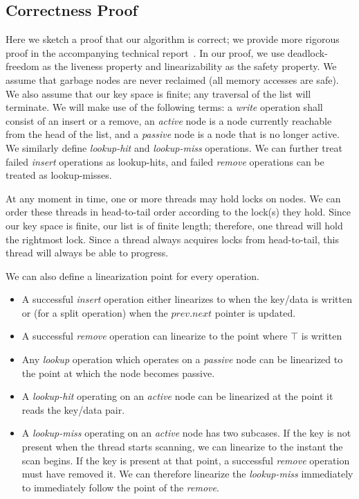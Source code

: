 \documentclass{llncs}
\begin{document}
{\subsection{Correctness Proof}
Here we sketch a proof that our algorithm is correct; we provide more rigorous proof in the accompanying technical report~\cite{Platz:Unrolled}. In our proof, we use deadlock-freedom as 
the liveness property and linearizability as the safety property.  We assume that garbage nodes are never reclaimed (all memory accesses are safe).  We also assume that our key space is finite; any traversal of the list will terminate.  We will make use of the following terms: a {\em write} operation shall consist of an insert or
a remove, an {\em active} node is a node currently reachable from the head of the list,
and a {\em passive} node is a node that is no longer active.  We similarly
define {\em lookup-hit} and {\em lookup-miss} operations.  We can further treat
failed {\em insert} operations as lookup-hits, and failed {\em remove} operations
can be treated as lookup-misses. 

At any moment in time, one or more threads may hold locks on nodes.  We can
order these threads in head-to-tail order according to the lock(s) they hold.  
Since our key space is finite, our list is of finite length; therefore,
one thread will hold the rightmost lock.  Since a thread always acquires locks from
head-to-tail, this thread will always be able to progress.

We can also define a linearization point for every operation.
\begin{itemize}
\item A successful {\em insert} operation either linearizes to when the key/data is written or
(for a split operation) when the $prev.next$ pointer is updated.
\item A successful {\em remove} operation can linearize to the point where $\top$ is written
\item Any {\em lookup} operation which operates on a {\em passive} node can be linearized to
the point at which the node becomes passive.
\item A {\em lookup-hit} operating on an {\em active} node can be linearized at the point
it reads the key/data pair.
\item A {\em lookup-miss} operating on an {\em active} node has two subcases.  If the
key is not present when the thread starts scanning, we can linearize to the instant the
scan begins.  If the key is present at that point, a successful {\em remove} operation must
have removed it.  We can therefore linearize the {\em lookup-miss} immediately to immediately follow the point of the {\em remove}.
\end{itemize}

}
\end{document}
